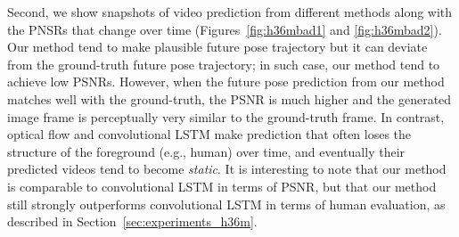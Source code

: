 \documentclass{article}
\begin{document}
\begin{appendix}
Second, we show snapshots of video prediction from different methods along with the PNSRs that change over time (Figures~\ref{fig:h36mbad1} and \ref{fig:h36mbad2}).
Our method tend to make plausible future pose trajectory but it can deviate from the ground-truth future pose trajectory; in such case, our method tend to achieve low PSNRs. 
However, when the future pose prediction from our method matches well with the ground-truth, the PSNR is much higher and the generated image frame is perceptually very similar to the ground-truth frame.
In contrast, optical flow and convolutional LSTM make prediction that often loses the structure of the foreground (e.g., human) over time, and eventually their predicted videos tend to become \emph{static}.
It is interesting to note that our method is comparable to convolutional LSTM in terms of PSNR, but that our method still strongly outperforms convolutional LSTM in terms of human evaluation, as described in Section~\ref{sec:experiments_h36m}. %


\end{appendix}
\end{document}
